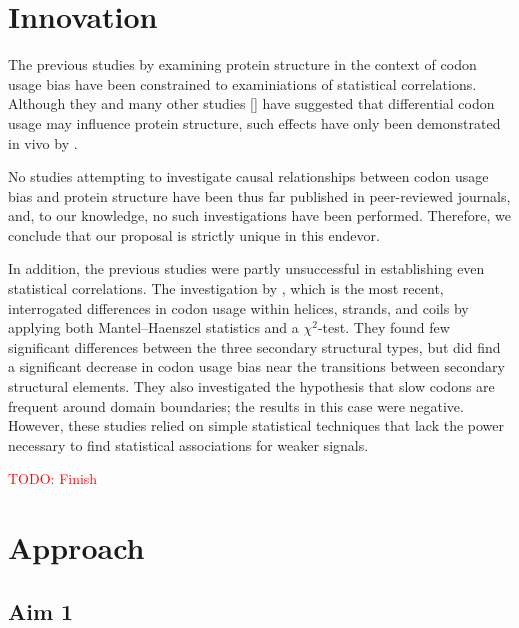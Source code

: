 \documentclass[11pt]{nih}
\newcommand{\todo}[1]{
\addcontentsline{tdo}{todo}{\protect{#1}}
\textcolor{red}{TODO: #1}
}
\begin{document}
\section{Innovation}

The previous studies by \citet{Saunders2010,Biro2006,Adzhubei1996,Gu2003} examining protein structure in the context of codon usage bias have been constrained to examiniations of statistical correlations. Although they and many other studies [] have suggested that differential codon usage may influence protein structure, such effects have only been demonstrated in vivo by \citet{Zhou2013,Sarfaty2007}.

No studies attempting to investigate causal relationships between codon usage bias and protein structure have been thus far published in peer-reviewed journals, and, to our knowledge, no such investigations have been performed. Therefore, we conclude that our proposal is strictly unique in this endevor.

In addition, the previous studies were partly unsuccessful in establishing even statistical correlations. The investigation by \citet{Saunders2010}, which is the most recent, interrogated differences in codon usage  within helices, strands, and coils by applying both Mantel--Haenszel statistics and a $\chi^2$-test. They found few significant differences between the three secondary structural types, but did find a significant decrease in codon usage bias near the transitions between secondary structural elements. They also investigated the hypothesis that slow codons are frequent around domain boundaries; the results in this case were negative. However, these studies relied on simple statistical techniques that lack the power necessary to find statistical associations for weaker signals.

\todo{Finish}

\section{Approach}


\subsection{Aim 1}
\end{document}
